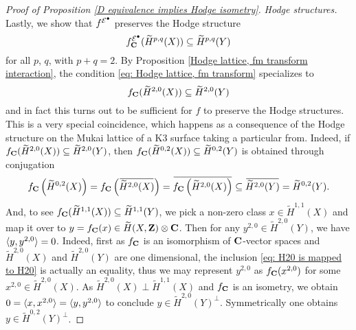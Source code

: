 \begin{proof}[Proof of Proposition \ref{D equivalence implies Hodge isometry}]
    \noindent
    \textsl{Hodge structures.}
    Lastly, we show that $f^{\mathcal E^\bullet}$ preserves the Hodge structure \ie
    \[
        f^{\mathcal E^\bullet}_\mathbf C(\widetilde{H}^{p,q}(X)) \subseteq \widetilde{H}^{p,q}(Y) 
    \]
    for all $p$, $q$, with $p + q = 2$. 
    By Proposition \ref{Hodge lattice, fm transform interaction}, the condition \eqref{eq: Hodge lattice, fm transform} specializes to 
    \begin{equation}
        \label{eq: H20 is mapped to H20}
        f_\mathbf C(\widetilde{H}^{2,0}(X)) \subseteq \widetilde{H}^{2,0}(Y)
    \end{equation}
    and in fact this turns out to be sufficient for $f$ to preserve the Hodge structures. This is a very special coincidence, which happens as a consequence of the Hodge structure on the Mukai lattice of a K3 surface taking a particular from.
    Indeed, if $f_\mathbf C(\widetilde{H}^{2,0}(X)) \subseteq \widetilde{H}^{2,0}(Y)$, then $f_\mathbf C(\widetilde{H}^{0,2}(X)) \subseteq \widetilde{H}^{0,2}(Y)$ is obtained through conjugation
    \[
        f_\C\left(\widetilde{H}^{0,2}(X)\right) = f_\C\left(\ols{\widetilde{H}^{2,0}(X)}\right) = \ols{f_\C\left(\widetilde{H}^{2,0}(X)\right)} \subseteq \ols{\widetilde{H}^{2,0}(Y)} = \widetilde{H}^{0,2}(Y).
    \]
    And, to see $f_\mathbf C(\widetilde{H}^{1,1}(X)) \subseteq \widetilde{H}^{1,1}(Y)$, we pick a non-zero class $x \in \widetilde{H}^{1,1}(X)$ and map it over to $y = f_\mathbf C(x) \in \widetilde{H}(X, \mathbf Z) \otimes \mathbf C$. Then for any $y^{2,0} \in \widetilde{H}^{2,0}(Y)$, we have $\langle y, y^{2,0} \rangle = 0$. Indeed, first as $f_\mathbf C$ is an isomorphism of $\mathbf C$-vector spaces and $\widetilde{H}^{2,0}(X)$ and $\widetilde{H}^{2,0}(Y)$ are one dimensional, the inclusion \eqref{eq: H20 is mapped to H20} is actually an equality, thus we may represent $y^{2,0}$ as $f_\mathbf C(x^{2,0})$ for some $x^{2,0} \in \widetilde{H}^{2,0}(X)$. As $\widetilde{H}^{2,0}(X) \perp \widetilde{H}^{1,1}(X)$ and $f_\mathbf C$ is an isometry, we obtain $0 = \langle x, x^{2,0} \rangle = \langle y, y^{2,0} \rangle$ to conclude $y \in \widetilde{H}^{2,0}(Y)^\perp$. Symmetrically one obtains $y \in \widetilde{H}^{0,2}(Y)^\perp$. 


\end{proof}
